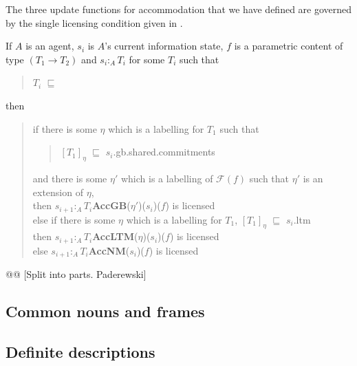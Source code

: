 The three update functions for accommodation that we have defined are
governed by the single licensing condition given in \nexteg{}.
\begin{ex} 
If $A$ is an agent, $s_i$ is $A$'s current information state, $f$ is a
parametric content of type $(T_1\rightarrow T_2)$ and
$s_i:_A T_i$ for some $T_i$ such that 
\begin{quote}
$T_i$ $\sqsubseteq$ 
\end{quote}
then \\
\begin{quote}
if there is some $\eta$ which is a labelling for $T_1$ such that 
\begin{quote}
$[T_1]_\eta$ $\sqsubseteq$ $s_i$.gb.shared.commitments
\end{quote}
and there is some $\eta'$ which is a labelling of $\mathcal{F}(f)$ such that $\eta'$ is an extension of
$\eta$,\\[.25\baselineskip]  
then $s_{i+1} :_A
T_i$\fbox{\d{$\wedge$}}\textbf{AccGB}($\eta'$)($s_i$)($f$) is
licensed\\[\baselineskip]
else if there is some $\eta$ which is a labelling for $T_1$, $[T_1]_\eta$
$\sqsubseteq$ $s_i$.ltm\\[.25\baselineskip]
then $s_{i+1} :_A
T_i$\fbox{\d{$\wedge$}}\textbf{AccLTM}($\eta$)($s_i$)($f$) is
licensed\\[\baselineskip] 
else $s_{i+1} :_A
T_i$\fbox{\d{$\wedge$}}\textbf{AccNM}($s_i$)($f$) is
licensed
\end{quote} 
\end{ex} 
     

  @@ [Split into parts.  Paderewski]

\subsection{Common nouns and frames}

\subsection{Definite descriptions}

